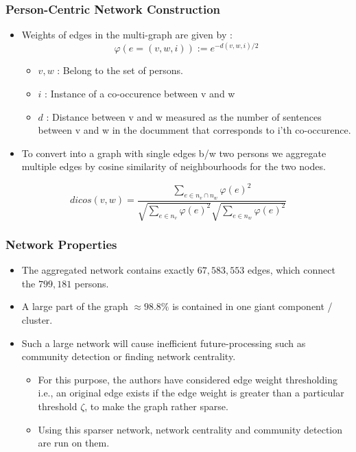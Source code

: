 \documentclass[10pt, compress]{beamer}
\begin{document}
\begin{frame}[fragile]
	\frametitle{Person-Centric Network Construction}
\begin{itemize}
\item Weights of edges in the multi-graph are given by : 
\begin{equation} \varphi(e = (v, w, i)) := e^{-d(v,w,i)/2} \end{equation}
\begin{itemize}
\item \(v,w\) : Belong to the set of persons.
\item \(i\) : Instance of a co-occurence between v and w 
\item \(d\) : Distance between v and w measured as the number of sentences between v and w in the documment that corresponds to i'th co-occurence.
\end{itemize}
\item To convert into a graph with single edges b/w two persons we aggregate multiple edges by cosine similarity of neighbourhoods for the two nodes.
\end{itemize}
\begin{equation}
dicos(v,w) = \frac{\sum_{e\in n_v \cap n_w} \varphi(e)^2}{\sqrt{\sum_{e\in n_v} \varphi(e)^2}\sqrt{\sum_{e\in n_w} \varphi(e)^2}}
\end{equation}
\end{frame}

\begin{frame}[fragile]
	\frametitle{Network Properties}
\begin{itemize}
\item The aggregated network contains exactly \(67, 583, 553\) edges, which connect the \(799, 181\) persons.
\item A large part of the graph \(\approx 98.8\%\) is contained in one giant component / cluster.
\item Such a large network will cause inefficient future-processing such as community detection or finding network centrality.
\begin{itemize}
	\item For this purpose, the authors have considered edge weight thresholding i.e., an original edge exists if the edge weight is greater than a particular threshold \(\zeta\),  to make the graph rather sparse.
    \item Using this sparser network, network centrality and community detection are run on them.
\end{itemize}
\end{itemize}
\end{frame}
\end{document}
